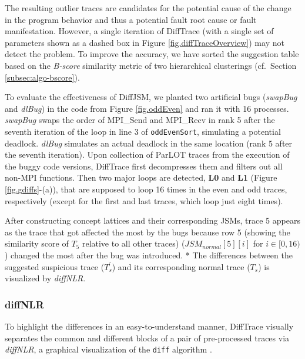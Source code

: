 % 
The resulting outlier traces are candidates for the potential cause of the change in the program behavior and thus a potential fault root cause or fault manifestation.
%
However, a single iteration of DiffTrace (with a single set of parameters shown as a dashed box in Figure \ref{fig.diffTraceOverview}) may not detect the problem. 
%
%
To improve the accuracy, we have sorted the suggestion table based on the \textit{B-score} similarity metric of two hierarchical clusterings \cite{fowlkes83} (cf.~Section \ref{subsec:algo-bscore}).

To evaluate the effectiveness of DiffJSM, we planted two artificial bugs (\textit{swapBug} and \textit{dlBug}) in the code from Figure \ref{fig.oddEven} and ran it with 16 processes.
%
\textit{swapBug} swaps the order of MPI\_Send and MPI\_Recv in rank 5 after the seventh iteration of the loop in line 3 of \texttt{oddEvenSort}, simulating a potential deadlock. \textit{dlBug} simulates an actual deadlock in the same location (rank 5 after the seventh iteration).
%
Upon collection of ParLOT traces from the execution of the buggy code versions, DiffTrace first decompresses them and filters out all non-MPI functions.
Then two major loops are detected, \textbf{L0} and \textbf{L1} (Figure \ref{fig.gdiffs}-(a)), that are supposed to loop 16 times in the even and odd traces, respectively (except for the first and last traces, which loop just eight times).

After constructing concept lattices and their corresponding JSMs, trace 5 appears as the trace that got affected the most by the bugs because row 5 (showing the similarity score of $T_5$ relative to all other traces) ($JSM_{normal}[5][i]$ for $i \in [0,16)$) changed the most after the bug was introduced. %
*
The differences between the suggested suspicious trace ($T^\prime_s$) and its corresponding normal trace ($T_s$) is visualized by \textit{diffNLR}.

\subsubsection{diffNLR}
To highlight the differences in an easy-to-understand manner, DiffTrace visually separates the common and different blocks of a pair of pre-processed traces via \textit{diffNLR}, a graphical visualization of the \texttt{diff} algorithm \cite{diff-myers}.
%

